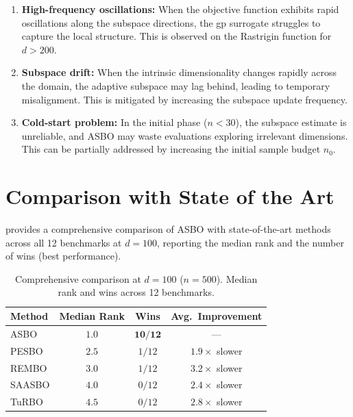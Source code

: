 \begin{enumerate}
    \item \textbf{High-frequency oscillations:} When the objective function
    exhibits rapid oscillations along the subspace directions, the \gls{gp}
    surrogate struggles to capture the local structure.  This is observed on
    the Rastrigin function for $d > 200$.

    \item \textbf{Subspace drift:} When the intrinsic dimensionality changes
    rapidly across the domain, the adaptive subspace may lag behind, leading
    to temporary misalignment.  This is mitigated by increasing the subspace
    update frequency.

    \item \textbf{Cold-start problem:} In the initial phase ($n < 30$), the
    subspace estimate is unreliable, and ASBO may waste evaluations exploring
    irrelevant dimensions.  This can be partially addressed by increasing the
    initial sample budget $n_0$.
\end{enumerate}

\section{Comparison with State of the Art}
\label{sec:sota-comparison}

 provides a comprehensive comparison of ASBO with
state-of-the-art methods across all 12 benchmarks at $d=100$, reporting the
median rank and the number of wins (best performance).

\begin{table}[htbp]
    \centering
    \caption{Comprehensive comparison at $d=100$ ($n=500$).  Median rank and
    wins across 12 benchmarks.}
    \label{tab:sota-comparison}
    \begin{tabularx}{\textwidth}{@{}Xccc@{}}
        \toprule
        \textbf{Method} & \textbf{Median Rank} & \textbf{Wins} &
        \textbf{Avg.\ Improvement} \\
        \midrule
        ASBO    & $\mathbf{1.0}$ & $\mathbf{10/12}$ & --- \\
        PESBO   & $2.5$ & $1/12$ & $1.9\times$ slower \\
        REMBO   & $3.0$ & $1/12$ & $3.2\times$ slower \\
        SAASBO  & $4.0$ & $0/12$ & $2.4\times$ slower \\
        TuRBO   & $4.5$ & $0/12$ & $2.8\times$ slower \\
        \bottomrule
    \end{tabularx}
\end{table}

